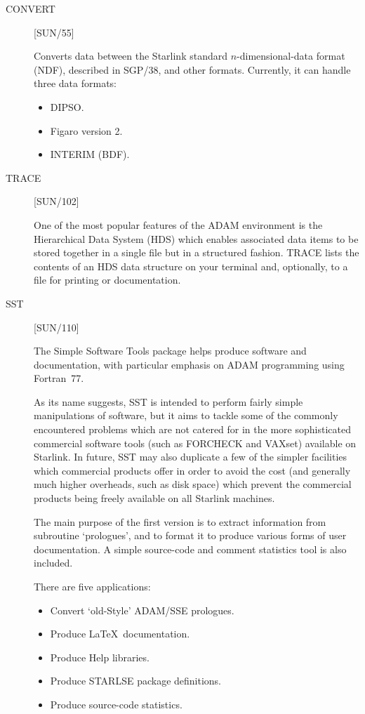 \begin{description}

\item [CONVERT] \hfill [SUN/55]

Converts data between the Starlink standard $n$-dimensional-data format
(NDF), described in SGP/38, and other formats.
Currently, it can handle three data formats:
\begin{itemize}
\item DIPSO.
\item Figaro version 2.
\item INTERIM (BDF).
\end{itemize}

\item [TRACE] \hfill [SUN/102]

One of the most popular features of the ADAM environment is the Hierarchical
Data System (HDS) which enables associated data items to be stored together in
a single file but in a structured fashion.
TRACE lists the contents of an HDS data structure on your terminal and,
optionally, to a file for printing or documentation.

\item [SST] \hfill [SUN/110]

The Simple Software Tools package helps produce software and documentation,
with particular emphasis on ADAM programming using Fortran~77. 

As its name suggests, SST is intended to perform fairly simple manipulations of
software, but it aims to tackle some of the commonly encountered problems which
are not catered for in the more sophisticated commercial software tools (such as
FORCHECK and VAXset) available on Starlink. 
In future, SST may also duplicate a few of the simpler facilities which
commercial products offer in order to avoid the cost (and generally much
higher overheads, such as disk space) which prevent the commercial products
being freely available on all Starlink machines. 

The main purpose of the first version is to extract information from subroutine
`prologues', and to format it to produce various forms of user documentation. 
A simple source-code and comment statistics tool is also included.

There are five applications:
\begin{itemize}
\item Convert `old-Style' ADAM/SSE prologues.
\item Produce \LaTeX\ documentation.
\item Produce Help libraries.
\item Produce STARLSE package definitions.
\item Produce source-code statistics.
\end{itemize}

\end{description}

